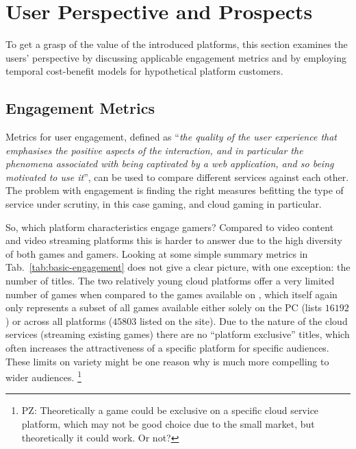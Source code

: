 \section{User Perspective and Prospects}
\label{sec:engagement}

To get a grasp of the value of the introduced platforms, this section examines the users' perspective by discussing applicable engagement metrics and by employing temporal cost-benefit models for hypothetical platform customers.



\subsection{Engagement Metrics}

Metrics for user engagement, defined as ``\textit{the quality of the user experience that emphasises the positive aspects of the interaction, and in particular the phenomena associated with being captivated by a web application, and so being motivated to use it}''\cite{Lehmann2012}, can be used to compare different services against each other. The problem with engagement is finding the right measures befitting the type of service under scrutiny, in this case gaming, and cloud gaming in particular.

So, which platform characteristics engage gamers? Compared to video content and video streaming platforms this is harder to answer due to the high diversity of both games and  gamers. Looking at some simple summary metrics in Tab.~\ref{tab:basic-engagement} does not give a clear picture, with one exception: the number of titles. The two relatively young cloud platforms offer a very limited number of games when compared to the games available on \steam, which itself again only represents a subset of all games available either solely on the PC (\metacritic lists $16192$) or across all platforms ($45803$ listed on the site). Due to the nature of the cloud services (streaming existing games) there are no ``platform exclusive'' titles, which often increases the attractiveness of a specific platform for specific audiences. These limits on variety might be one reason why \steam is much more compelling to wider audiences.
\footnote{PZ: Theoretically a game could be exclusive on a specific cloud service platform, which may not be good choice due to the small market, but theoretically it could work. Or not?}

